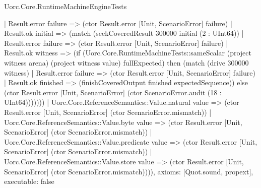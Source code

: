 \begin{lexlean}{Uorc.Core.RuntimeMachineEngineTests}
\begin{semanticmodule}
{          | Result.error failure => (ctor Result.error [Unit, ScenarioError] failure)
          | Result.ok initial => (match (seekCoveredResult 300000 initial (2 : UInt64))
            | Result.error failure => (ctor Result.error [Unit, ScenarioError] failure)
            | Result.ok witness => (if (Uorc.Core.RuntimeMachineTests::sameScalar (project witness arena) (project witness value) fullExpected) then (match (drive 300000 witness)
              | Result.error failure => (ctor Result.error [Unit, ScenarioError] failure)
              | Result.ok finished => (finishCoveredOutput finished expectedSequence)) else (ctor Result.error [Unit, ScenarioError] (ctor ScenarioError.audit (18 : UInt64)))))))
      | Uorc.Core.ReferenceSemantics::Value.natural value => (ctor Result.error [Unit, ScenarioError] (ctor ScenarioError.mismatch))
      | Uorc.Core.ReferenceSemantics::Value.byte value => (ctor Result.error [Unit, ScenarioError] (ctor ScenarioError.mismatch))
      | Uorc.Core.ReferenceSemantics::Value.predicate value => (ctor Result.error [Unit, ScenarioError] (ctor ScenarioError.mismatch))
      | Uorc.Core.ReferenceSemantics::Value.store value => (ctor Result.error [Unit, ScenarioError] (ctor ScenarioError.mismatch)))),
  axioms: [Quot.sound, propext],
  executable: false
}


\end{semanticmodule}
\end{lexlean}
